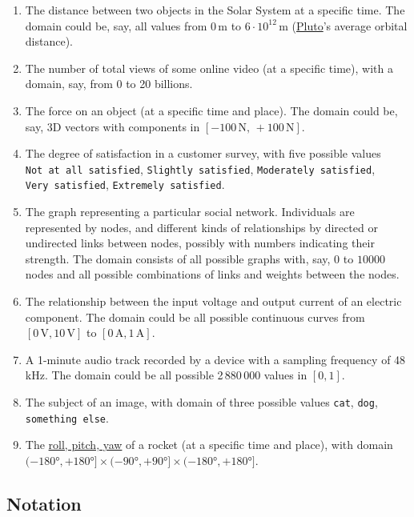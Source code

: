 \documentclass[
  a4paper,
  DIV=11,
  numbers=noendperiod,
  oneside]{scrreprt}
\begin{document}
\begin{enumerate}
\def\labelenumi{\arabic{enumi}.}
\item
  The distance between two objects in the Solar System at a specific
  time. The domain could be, say, all values from \(0\,\mathrm{m}\) to
  \(6\cdot10^{12}\,\mathrm{m}\)
  (\href{https://solarsystem.nasa.gov/planets/dwarf-planets/pluto}{Pluto}'s
  average orbital distance).
\item
  The number of total views of some online video (at a specific time),
  with a domain, say, from 0 to 20 billions.
\item
  The force on an object (at a specific time and place). The domain
  could be, say, 3D vectors with components in
  \([-100\,\mathrm{N},\,+100\,\mathrm{N}]\).
\item
  The degree of satisfaction in a customer survey, with five possible
  values \texttt{Not\ at\ all\ satisfied}, \texttt{Slightly\ satisfied},
  \texttt{Moderately\ satisfied}, \texttt{Very\ satisfied},
  \texttt{Extremely\ satisfied}.
\item
  The graph representing a particular social network. Individuals are
  represented by nodes, and different kinds of relationships by directed
  or undirected links between nodes, possibly with numbers indicating
  their strength. The domain consists of all possible graphs with, say,
  \(0\) to \(10000\) nodes and all possible combinations of links and
  weights between the nodes.
\item
  The relationship between the input voltage and output current of an
  electric component. The domain could be all possible continuous curves
  from \([0\,\mathrm{V}, 10\,\mathrm{V}]\) to
  \([0\,\mathrm{A}, 1\,\mathrm{A}]\).
\item
  A 1-minute audio track recorded by a device with a sampling frequency
  of 48\,kHz. The domain could be all possible 2\,880\,000 values in
  \([0,1]\).
\item
  The subject of an image, with domain of three possible values
  \texttt{cat}, \texttt{dog}, \texttt{something\ else}.
\item
  The
  \href{https://www.grc.nasa.gov/www/k-12/rocket/rotations.html}{roll,
  pitch, yaw} of a rocket (at a specific time and place), with domain
  \((-180°,+180°]\times(-90°,+90°]\times(-180°,+180°]\).
\end{enumerate}

\hypertarget{notation}{%
\subsection{Notation}\label{notation}}
\end{document}

